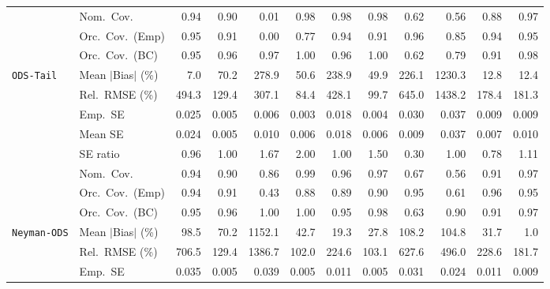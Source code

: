 \begin{landscape}
\begin{longtable}{llrrrrrrrrrr}
 & Nom.\ Cov. & \cellcolor{rankone}0.94 & 0.90 & 0.01 & 0.98 & \cellcolor{rankthree}0.98 & 0.98 & 0.62 & 0.56 & 0.88 & \cellcolor{ranktwo}0.97 \\
 & Orc.\ Cov.\ (Emp) & \cellcolor{ranktwo}0.95 & 0.91 & 0.00 & 0.77 & 0.94 & 0.91 & \cellcolor{rankthree}0.96 & 0.85 & 0.94 & \cellcolor{rankone}0.95 \\
 & Orc.\ Cov.\ (BC) & \cellcolor{rankone}0.95 & \cellcolor{ranktwo}0.96 & 0.97 & 1.00 & \cellcolor{rankthree}0.96 & 1.00 & 0.62 & 0.79 & 0.91 & 0.98 \\
\addlinespace[2pt]
\quad \texttt{ODS-Tail} & Mean $|$Bias$|$ (\%) & \cellcolor{rankone}7.0 & 70.2 & 278.9 & 50.6 & 238.9 & 49.9 & 226.1 & 1230.3 & \cellcolor{rankthree}12.8 & \cellcolor{ranktwo}12.4 \\
 & Rel.\ RMSE (\%) & 494.3 & \cellcolor{rankthree}129.4 & 307.1 & \cellcolor{rankone}84.4 & 428.1 & \cellcolor{ranktwo}99.7 & 645.0 & 1438.2 & 178.4 & 181.3 \\
 & Emp.\ SE & 0.025 & 0.005 & 0.006 & 0.003 & 0.018 & 0.004 & 0.030 & 0.037 & 0.009 & 0.009 \\
 & Mean SE & 0.024 & 0.005 & 0.010 & 0.006 & 0.018 & 0.006 & 0.009 & 0.037 & 0.007 & 0.010 \\
 & SE ratio & 0.96 & \cellcolor{rankone}1.00 & 1.67 & 2.00 & \cellcolor{ranktwo}1.00 & 1.50 & 0.30 & \cellcolor{rankthree}1.00 & 0.78 & 1.11 \\
 & Nom.\ Cov. & \cellcolor{rankone}0.94 & 0.90 & 0.86 & 0.99 & \cellcolor{ranktwo}0.96 & \cellcolor{rankthree}0.97 & 0.67 & 0.56 & 0.91 & 0.97 \\
 & Orc.\ Cov.\ (Emp) & \cellcolor{rankthree}0.94 & 0.91 & 0.43 & 0.88 & 0.89 & 0.90 & \cellcolor{rankone}0.95 & 0.61 & 0.96 & \cellcolor{ranktwo}0.95 \\
 & Orc.\ Cov.\ (BC) & \cellcolor{rankone}0.95 & \cellcolor{rankthree}0.96 & 1.00 & 1.00 & \cellcolor{ranktwo}0.95 & 0.98 & 0.63 & 0.90 & 0.91 & 0.97 \\
\addlinespace[2pt]
\quad \texttt{Neyman-ODS} & Mean $|$Bias$|$ (\%) & 98.5 & 70.2 & 1152.1 & 42.7 & \cellcolor{ranktwo}19.3 & \cellcolor{rankthree}27.8 & 108.2 & 104.8 & 31.7 & \cellcolor{rankone}1.0 \\
 & Rel.\ RMSE (\%) & 706.5 & \cellcolor{rankthree}129.4 & 1386.7 & \cellcolor{rankone}102.0 & 224.6 & \cellcolor{ranktwo}103.1 & 627.6 & 496.0 & 228.6 & 181.7 \\
 & Emp.\ SE & 0.035 & 0.005 & 0.039 & 0.005 & 0.011 & 0.005 & 0.031 & 0.024 & 0.011 & 0.009 \\

\end{longtable}
\end{landscape}
